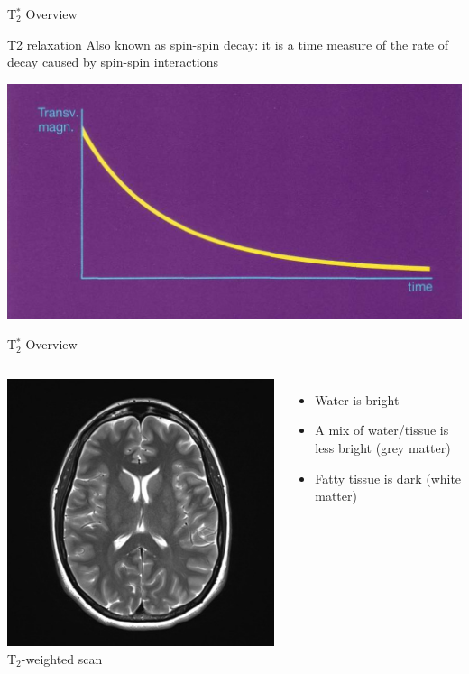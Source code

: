 \documentclass[aspectratio=169,xcolor=dvipsnames]{beamer}
\begin{document}

\begin{frame}{T$_{2}^{*}$ Overview}
    \begin{block}{T2 relaxation}
        Also known as spin-spin decay: it is a time measure of the rate of decay caused by spin-spin interactions
    \end{block}
\begin{center}
\includegraphics[width=.75\textwidth]{imgs/T2curv}

\end{center}
\end{frame}


\begin{frame}{T$_{2}^{*}$ Overview}
\begin{columns}[c]
\includegraphics[width=1\textwidth]{imgs/t2brain}
T$_{2}$-weighted scan
\begin{itemize}
\item Water is bright
\item A mix of water/tissue is less bright (grey matter)
\item Fatty tissue is dark (white matter)
\end{itemize}
\end{columns}

\end{frame}
\end{document}
